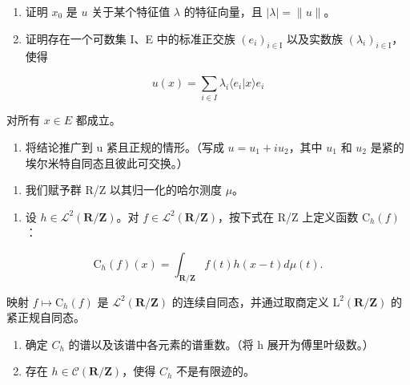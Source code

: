 \begin{enumerate}
\def\labelenumi{\alph{enumi})}
\setcounter{enumi}{2}
\item
  证明 \(x_{0}\) 是 \(u\) 关于某个特征值 \(\lambda\) 的特征向量，且 \(|\lambda| = \|u\|\)。
\item
  证明存在一个可数集 I、E 中的标准正交族 \((e_{i})_{i\in\mathrm{I}}\) 以及实数族 \((\lambda_{i})_{i\in\mathrm{I}}\)，使得
\end{enumerate}

\[
u (x) = \sum_ {i \in I} \lambda_ {i} \langle e _ {i} | x \rangle e _ {i}
\]

对所有 \(x \in E\) 都成立。

\begin{enumerate}
\def\labelenumi{\alph{enumi})}
\setcounter{enumi}{4}
\tightlist
\item
  将结论推广到 u 紧且正规的情形。（写成 \(u = u_{1} + iu_{2}\)，其中 \(u_{1}\) 和 \(u_{2}\) 是紧的埃尔米特自同态且彼此可交换。）
\end{enumerate}

\begin{enumerate}
\def\labelenumi{\arabic{enumi})}
\setcounter{enumi}{7}
\tightlist
\item
  我们赋予群 R/Z 以其归一化的哈尔测度 \(\mu\)。
\end{enumerate}

\begin{enumerate}
\def\labelenumi{\alph{enumi})}
\tightlist
\item
  设 \(h \in \mathcal{L}^{2}(\mathbf{R}/\mathbf{Z})\)。对 \(f \in \mathcal{L}^{2}(\mathbf{R}/\mathbf{Z})\)，按下式在 R/Z 上定义函数 \(\mathrm{C}_{h}(f)\)：
\end{enumerate}

\[
\mathrm{C} _ {h} (f) (x) = \int_ {\mathbf {R} / \mathbf {Z}} f (t) h (x - t) d \mu (t).
\]

映射 \(f \mapsto \mathrm{C}_h(f)\) 是 \(\mathcal{L}^2(\mathbf{R}/\mathbf{Z})\) 的连续自同态，并通过取商定义 \(\mathrm{L}^2(\mathbf{R}/\mathbf{Z})\) 的紧正规自同态。

\begin{enumerate}
\def\labelenumi{\alph{enumi})}
\setcounter{enumi}{1}
\item
  确定 \(C_{h}\) 的谱以及该谱中各元素的谱重数。（将 h 展开为傅里叶级数。）
\item
  存在 \(h \in \mathcal{C}(\mathbf{R}/\mathbf{Z})\)，使得 \(C_{h}\) 不是有限迹的。
\end{enumerate}

